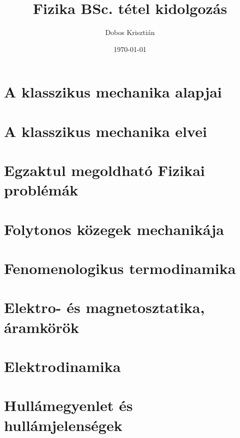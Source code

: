 \documentclass[a4paper,12pt]{article}
\title{Fizika BSc. tétel kidolgozás}
\author{Dobos Krisztián}
\date{\today}
\begin{document}
\maketitle
\tableofcontents
\newpage

\section{A klasszikus mechanika alapjai}


\newpage
\section{A klasszikus mechanika elvei \cite{susskind}}


\newpage
\section{Egzaktul megoldható Fizikai problémák}


\newpage
\section{Folytonos közegek mechanikája}


\newpage
\section{Fenomenologikus termodinamika}


\newpage
\section{Elektro- és magnetosztatika, áramkörök \cite{electro_intro}}


\newpage
\section{Elektrodinamika \cite{electro_intro}}


\newpage
\section{Hullámegyenlet és hullámjelenségek \cite{electro_intro}}

\end{document}
